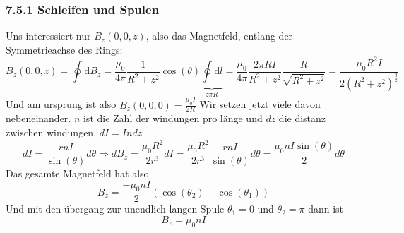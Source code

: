 \documentclass{article}
\begin{document}
\subsubsection*{7.5.1 Schleifen und Spulen}
Uns interessiert nur $B_z(0,0,z)$, also das Magnetfeld, entlang der Symmetrieachse des Rings:
\[B_z(0,0,z)=\oint^{}_{}\text{d}B_z=\frac{\mu_0}{4\pi}\frac{1}{R^2+z^2}\cos(\theta) \underset{z\pi R}{\underbrace{\oint^{}_{}\text{d}l}}=\frac{\mu_0}{4\pi}\frac{2\pi R I }{R^2+ z^2}\frac{R}{\sqrt{R^2+z^2}}=\frac{\mu_0 R^2 I }{2(R^2+ z^2)^{\frac{3}{2}}}\]
Und am ursprung ist also $B_z(0,0,0)=\frac{\mu_0 I }{2R}$
Wir setzen jetzt viele davon nebeneinander. $n$ ist die Zahl der windungen pro länge und $dz$ die distanz zwischen windungen. $d I= I n dz$ 
\[dI = \frac{rnI }{\sin(\theta)}d\theta \Rightarrow dB_z=\frac{\mu_0 R^2}{2r^3}dI=\frac{\mu_0 R^2}{2r^3}\frac{rnI}{\sin(\theta)}d\theta=\frac{\mu_0nI\sin(\theta)}{2}d\theta\]
Das gesamte Magnetfeld hat also \[B_z=\frac{-\mu_0nI}{2}(\cos(\theta_2)-\cos(\theta_1))\]
Und mit den übergang zur unendlich langen Spule $\theta_1=0$ und $\theta_2=\pi$ dann ist 
\[B_z=\mu_0 n I\]
\end{document}
